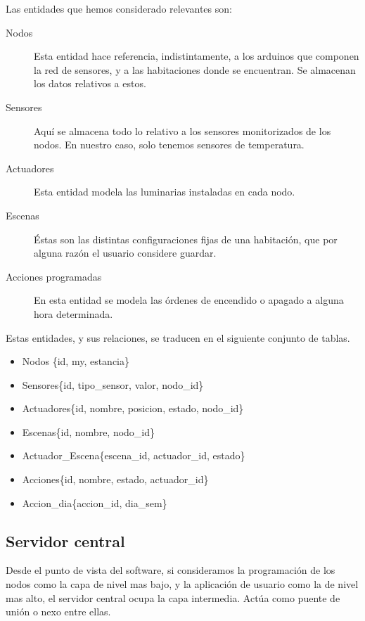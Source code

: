 Las entidades que hemos considerado relevantes son:
\begin{description}
    \item[Nodos] Esta entidad hace referencia, indistintamente, a los arduinos que componen la red de sensores, y a las habitaciones donde se encuentran. Se almacenan los datos relativos a estos.
    \item[Sensores] Aquí se almacena todo lo relativo a los sensores monitorizados de los nodos. En nuestro caso, solo tenemos sensores de temperatura. 
    \item[Actuadores] Esta entidad modela las luminarias instaladas en cada nodo. 
    \item[Escenas] Éstas son las distintas configuraciones fijas de una habitación, que por alguna razón el usuario considere guardar.
    \item[Acciones programadas] En esta entidad se modela las órdenes de encendido o apagado a alguna hora determinada.
\end{description}

Estas entidades, y sus relaciones, se traducen en el siguiente conjunto de tablas.

\begin{itemize}
   \item Nodos \{id, my, estancia\}
   \item Sensores\{id, tipo\_sensor, valor, nodo\_id\}
   \item Actuadores\{id, nombre, posicion, estado, nodo\_id\}
   \item Escenas\{id, nombre, nodo\_id\}
   \item Actuador\_Escena\{escena\_id, actuador\_id, estado\}
   \item Acciones\{id, nombre, estado, actuador\_id\}
   \item Accion\_dia\{accion\_id, dia\_sem\}
\end{itemize}





\subsection{Servidor central}

 Desde el punto de vista del software, si consideramos la programación de los nodos como la capa de nivel mas bajo, y la aplicación de usuario como la de nivel mas alto, el servidor central ocupa la capa intermedia. Actúa como puente de unión o nexo entre ellas.
 
